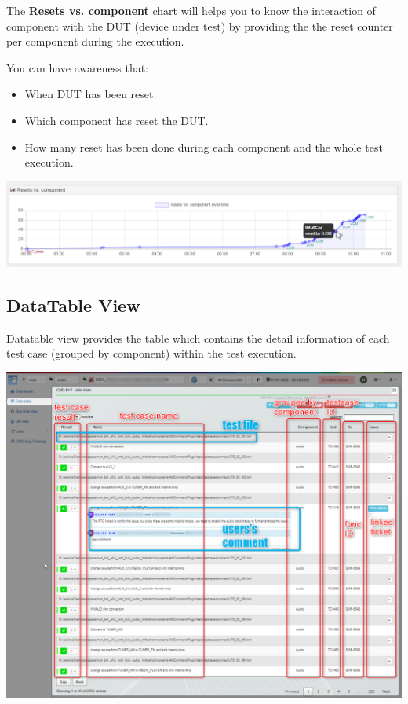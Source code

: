 The \textbf{Resets vs. component} chart will helps you to know the interaction
of component with the DUT (device under test) by providing the the reset counter
per component during the execution.

You can have awareness that:
\begin{itemize}
   \item When DUT has been reset.
   \item Which component has reset the DUT.
   \item How many reset has been done during each component and the whole
         test execution.
\end{itemize}

\includegraphics[width=1\linewidth]
{./pictures/dashboard/reset_vs_component.png}

\hypertarget{datatable-view}{%
\subsection{DataTable View}\label{datatable-view}}

Datatable view provides the table which contains the detail information of each
test case (grouped by component) within the test execution.

\includegraphics[width=1\linewidth]{./pictures/view_datatable.png}

